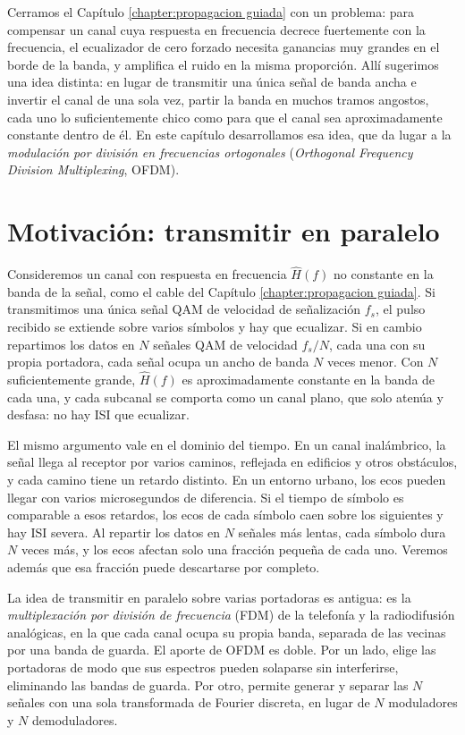 Cerramos el Capítulo \ref{chapter:propagacion guiada} con un problema: para compensar un canal cuya respuesta en frecuencia decrece fuertemente con la frecuencia, el ecualizador de cero forzado necesita ganancias muy grandes en el borde de la banda, y amplifica el ruido en la misma proporción. Allí sugerimos una idea distinta: en lugar de transmitir una única señal de banda ancha e invertir el canal de una sola vez, partir la banda en muchos tramos angostos, cada uno lo suficientemente chico como para que el canal sea aproximadamente constante dentro de él. En este capítulo desarrollamos esa idea, que da lugar a la \emph{modulación por división en frecuencias ortogonales} (\emph{Orthogonal Frequency Division Multiplexing}, OFDM).

\section{Motivación: transmitir en paralelo}\label{sec:ofdm motivacion}

Consideremos un canal con respuesta en frecuencia $\hat H(f)$ no constante en la banda de la señal, como el cable del Capítulo \ref{chapter:propagacion guiada}. Si transmitimos una única señal QAM de velocidad de señalización $f_s$, el pulso recibido se extiende sobre varios símbolos y hay que ecualizar. Si en cambio repartimos los datos en $N$ señales QAM de velocidad $f_s/N$, cada una con su propia portadora, cada señal ocupa un ancho de banda $N$ veces menor. Con $N$ suficientemente grande, $\hat H(f)$ es aproximadamente constante en la banda de cada una, y cada subcanal se comporta como un canal plano, que solo atenúa y desfasa: no hay ISI que ecualizar.

El mismo argumento vale en el dominio del tiempo. En un canal inalámbrico, la señal llega al receptor por varios caminos, reflejada en edificios y otros obstáculos, y cada camino tiene un retardo distinto. En un entorno urbano, los ecos pueden llegar con varios microsegundos de diferencia. Si el tiempo de símbolo es comparable a esos retardos, los ecos de cada símbolo caen sobre los siguientes y hay ISI severa. Al repartir los datos en $N$ señales más lentas, cada símbolo dura $N$ veces más, y los ecos afectan solo una fracción pequeña de cada uno. Veremos además que esa fracción puede descartarse por completo.

La idea de transmitir en paralelo sobre varias portadoras es antigua: es la \emph{multiplexación por división de frecuencia} (FDM) de la telefonía y la radiodifusión analógicas, en la que cada canal ocupa su propia banda, separada de las vecinas por una banda de guarda. El aporte de OFDM es doble. Por un lado, elige las portadoras de modo que sus espectros pueden solaparse sin interferirse, eliminando las bandas de guarda. Por otro, permite generar y separar las $N$ señales con una sola transformada de Fourier discreta, en lugar de $N$ moduladores y $N$ demoduladores.

